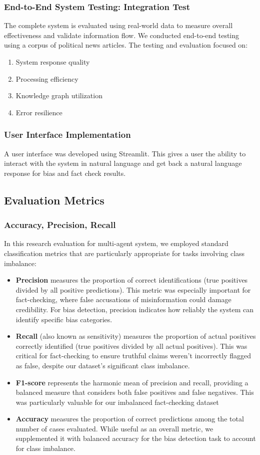 \documentclass{scrartcl}
\begin{document}
\subsubsection{End-to-End System Testing: Integration Test}
The complete system is evaluated using real-world data to measure overall effectiveness and validate information flow. We conducted end-to-end testing using a corpus of political news articles. The testing and evaluation focused on:
\begin{enumerate}
    \item System response quality
    \item Processing efficiency
    \item Knowledge graph utilization
    \item Error resilience 
\end{enumerate}

\subsubsection{User Interface Implementation}
A user interface was developed using Streamlit. This gives a user the ability to interact with the system in natural language and get back a natural language response for bias and fact check results. 

\subsection{Evaluation Metrics}
\subsubsection{Accuracy, Precision, Recall}
In this research evaluation for multi-agent system, we employed standard classification metrics that are particularly appropriate for tasks involving class imbalance:
\begin{itemize}
    \item \textbf{Precision} measures the proportion of correct identifications (true positives divided by all positive predictions). This metric was especially important for fact-checking, where false accusations of misinformation could damage credibility. For bias detection, precision indicates how reliably the system can identify specific bias categories.
    \item \textbf{Recall} (also known as sensitivity) measures the proportion of actual positives correctly identified (true positives divided by all actual positives). This was critical for fact-checking to ensure truthful claims weren’t incorrectly flagged as false, despite our dataset’s significant class imbalance.
    \item \textbf{F1-score} represents the harmonic mean of precision and recall, providing a balanced measure that considers both false positives and false negatives. This was particularly valuable for our imbalanced fact-checking dataset 
    \item \textbf{Accuracy} measures the proportion of correct predictions among the total number of cases evaluated. While useful as an overall metric, we supplemented it with balanced accuracy for the bias detection task to account for class imbalance.
\end{itemize}
\end{document}

